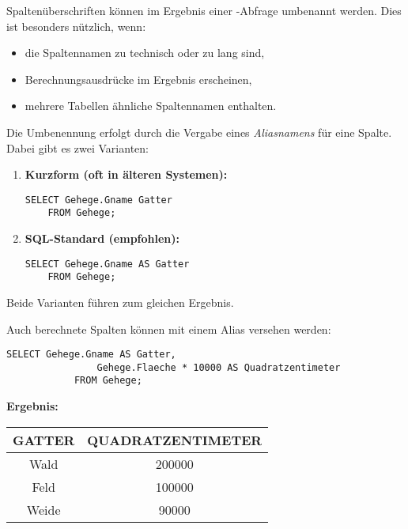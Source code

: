     Spaltenüberschriften können im Ergebnis einer -Abfrage umbenannt werden.
    Dies ist besonders nützlich, wenn:
    \begin{itemize}
        \item die Spaltennamen zu technisch oder zu lang sind,
        \item Berechnungsausdrücke im Ergebnis erscheinen,
        \item mehrere Tabellen ähnliche Spaltennamen enthalten.
    \end{itemize}
    Die Umbenennung erfolgt durch die Vergabe eines \emph{Aliasnamens} für eine Spalte.
    Dabei gibt es zwei Varianten:
    \begin{enumerate}
        \item \textbf{Kurzform (oft in älteren Systemen):}
        \begin{lstlisting}[style=sqlstyle]
    SELECT Gehege.Gname Gatter
    FROM Gehege;
        \end{lstlisting}
        \item \textbf{SQL-Standard (empfohlen):}
        \begin{lstlisting}[style=sqlstyle]
    SELECT Gehege.Gname AS Gatter
    FROM Gehege;
        \end{lstlisting}
    \end{enumerate}
    Beide Varianten führen zum gleichen Ergebnis.


    \begin{tcolorbox}[gray={Beispiel mit Berechnung}]
        Auch berechnete Spalten können mit einem Alias versehen werden:
        \begin{lstlisting}[style=sqlstyle]
            SELECT Gehege.Gname AS Gatter,
                Gehege.Flaeche * 10000 AS Quadratzentimeter
            FROM Gehege;
        \end{lstlisting}

        \textbf{Ergebnis:}
            \begin{center}
                \begin{tabular}{|c|c|}
                \hline
                \textbf{GATTER} & \textbf{QUADRATZENTIMETER} \\
                \hline
                Wald & 200000 \\
                \hline
                Feld & 100000 \\
                \hline
                Weide & 90000 \\
                \hline
            \end{tabular}
        \end{center}
    \end{tcolorbox}

